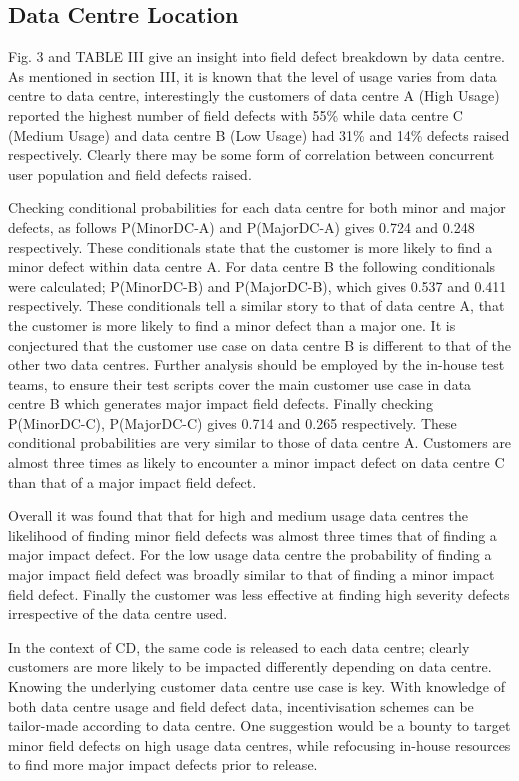 \documentclass[conference]{IEEEtran}
\begin{document}
\subsection{Data Centre Location}
Fig. 3 and TABLE III give an insight into field defect breakdown by data centre. As mentioned in section III, it is known that the level of usage varies from data centre to data centre, interestingly the customers of data centre A (High Usage) reported the highest number of field defects with 55\% while data centre C (Medium Usage) and data centre B (Low Usage) had 31\% and 14\% defects raised respectively. Clearly there may be some form of correlation between concurrent user population and field defects raised. \par
Checking conditional probabilities for each data centre for both minor and major defects, as follows P(Minor\textbar DC-A) and P(Major\textbar DC-A) gives 0.724 and 0.248 respectively. These conditionals state that the customer is more likely to find a minor defect within data centre A. For data centre B  the following conditionals were calculated; P(Minor\textbar DC-B) and P(Major\textbar DC-B), which gives 0.537 and 0.411 respectively. These conditionals tell a similar story to that of data centre A, that the customer is more likely to find a minor defect than a major one. It is conjectured that the customer use case on data centre B is different to that of the other two data centres. Further analysis should be employed by the in-house test teams, to ensure their test scripts cover the main customer use case in data centre B which generates major impact field defects. Finally checking P(Minor\textbar DC-C), P(Major\textbar DC-C) gives 0.714 and 0.265 respectively. These conditional probabilities are very similar to those of data centre A. Customers are almost three times as likely to encounter a minor impact defect on data centre C than that of a major impact field defect. \par
Overall it was found that that for high and medium usage data centres the likelihood of finding minor field defects was almost three times that of finding a major impact defect. For the low usage data centre the probability of finding a major impact field defect was broadly similar to that of finding a minor impact field defect. Finally the customer was less effective at finding high severity defects irrespective of the data centre used. \par
In the context of CD, the same code is released to each data centre; clearly customers are more likely to be impacted differently depending on data centre. Knowing the underlying customer data centre use case is key.
With knowledge of both data centre usage and field defect data, incentivisation schemes can be tailor-made according to data centre. One suggestion would be a bounty to target minor field defects on high usage data centres, while refocusing in-house resources to find more major impact defects prior to release. 
\end{document}
